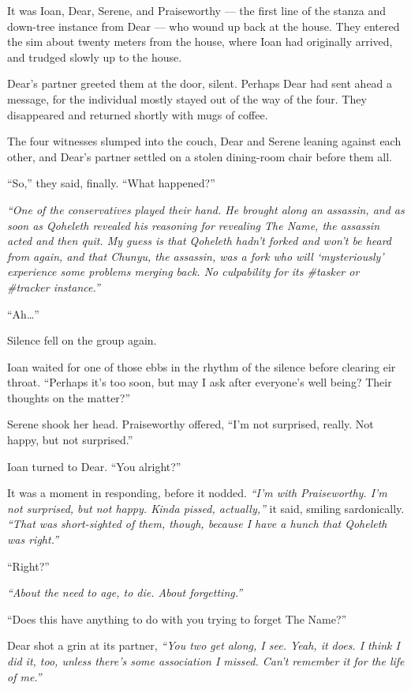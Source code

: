 It was Ioan, Dear, Serene, and Praiseworthy --- the first line of the stanza and down-tree instance from Dear --- who wound up back at the house. They entered the sim about twenty meters from the house, where Ioan had originally arrived, and trudged slowly up to the house. %

Dear's partner greeted them at the door, silent. Perhaps Dear had sent ahead a message, for the individual mostly stayed out of the way of the four. They disappeared and returned shortly with mugs of coffee.

The four witnesses slumped into the couch, Dear and Serene leaning against each other, and Dear's partner settled on a stolen dining-room chair before them all.

``So,'' they said, finally. ``What happened?''

\emph{``One of the conservatives played their hand. He brought along an assassin, and as soon as Qoheleth revealed his reasoning for revealing The Name, the assassin acted and then quit. My guess is that Qoheleth hadn't forked and won't be heard from again, and that Chunyu, the assassin, was a fork who will `mysteriously' experience some problems merging back. No culpability for its \#tasker or \#tracker instance.''}

``Ah\ldots{}''

Silence fell on the group again.

Ioan waited for one of those ebbs in the rhythm of the silence before clearing eir throat. ``Perhaps it's too soon, but may I ask after everyone's well being? Their thoughts on the matter?''

Serene shook her head. Praiseworthy offered, ``I'm not surprised, really. Not happy, but not surprised.''

Ioan turned to Dear. ``You alright?''

It was a moment in responding, before it nodded. \emph{``I'm with Praiseworthy. I'm not surprised, but not happy. Kinda pissed, actually,''} it said, smiling sardonically. \emph{``That was short-sighted of them, though, because I have a hunch that Qoheleth was right.''}

``Right?''

\emph{``About the need to age, to die. About forgetting.''}

``Does this have anything to do with you trying to forget The Name?''

Dear shot a grin at its partner, \emph{``You two get along, I see. Yeah, it does. I think I did it, too, unless there's some association I missed. Can't remember it for the life of me.''}


